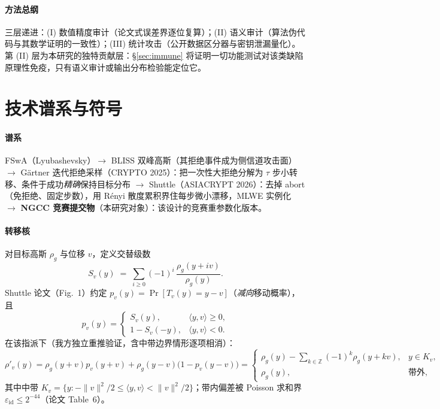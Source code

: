 \documentclass[11pt,a4paper]{ctexart}
\newcommand{\ZZ}{\mathbb{Z}}
\begin{document}
\paragraph{方法总纲} 三层递进：(I) 数值精度审计（论文式误差界逐位复算）；(II) 语义审计（算法伪代码与其数学证明的一致性）；(III) 统计攻击（公开数据区分器与密钥泄漏量化）。第 (II) 层为本研究的独特贡献层：\S\ref{sec:immune} 将证明一切功能测试对该类缺陷原理性免疫，只有语义审计或输出分布检验能定位它。

\section{技术谱系与符号}\label{sec:background}

\paragraph{谱系} FSwA（Lyubashevsky）$\to$ BLISS 双峰高斯（其拒绝事件成为侧信道攻击面\cite{fgrtbliss}）$\to$ G\"artner 迭代拒绝采样\cite{gaertner}（CRYPTO 2025）：把一次性大拒绝分解为 $\tau$ 步小转移、条件于成功\emph{精确}保持目标分布 $\to$ Shuttle\cite{shuttle}（ASIACRYPT 2026）：去掉 abort（免拒绝、固定步数），用 Rényi 散度累积界住每步微小漂移，MLWE 实例化 $\to$ \textbf{NGCC 竞赛提交物}（本研究对象）：该设计的竞赛重参数化版本。

\paragraph{转移核} 对目标高斯 $\rho_g$ 与位移 $v$，定义交替级数
\begin{equation}
S_v(y)\;=\;\sum_{i\ge 0}(-1)^i\,\frac{\rho_g(y+iv)}{\rho_g(y)} .
\end{equation}
Shuttle 论文（Fig.~1）约定 $p_v(y)=\Pr[T_v(y)=y-v]$（\emph{减向}移动概率），且
\begin{equation}\label{eq:pv}
p_v(y)=\begin{cases} S_v(y), & \langle y,v\rangle\ge 0,\\[2pt] 1-S_v(-y), & \langle y,v\rangle<0 .\end{cases}
\end{equation}
在该指派下（我方独立重推验证，含中带边界情形逐项相消）：
\begin{equation}\label{eq:invariant}
\rho'_v(y)=\rho_g(y+v)p_v(y+v)+\rho_g(y-v)\bigl(1-p_v(y-v)\bigr)
=\begin{cases}\rho_g(y)-\sum_{k\in\ZZ}(-1)^k\rho_g(y+kv), & y\in K_v,\\ \rho_g(y), & \text{带外},\end{cases}
\end{equation}
其中中带 $K_v=\{y:-\|v\|^2/2\le\langle y,v\rangle<\|v\|^2/2\}$；带内偏差被 Poisson 求和界 $\varepsilon_{\mathrm{id}}\le 2^{-44}$（论文 Table~6）。
\end{document}
